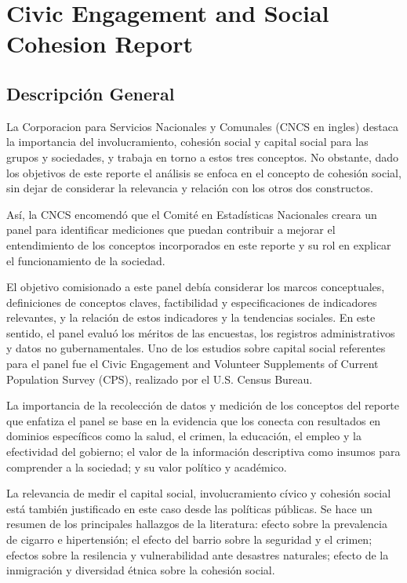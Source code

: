 \documentclass[
  12pt,
]{book}
\begin{document}
\hypertarget{civic-engagement-and-social-cohesion-report}{%
\chapter{Civic Engagement and Social Cohesion Report}\label{civic-engagement-and-social-cohesion-report}}

\hypertarget{descripciuxf3n-general-3}{%
\section{Descripción General}\label{descripciuxf3n-general-3}}

La Corporacion para Servicios Nacionales y Comunales (CNCS en ingles)
destaca la importancia del involucramiento, cohesión social y capital
social para las grupos y sociedades, y trabaja en torno a estos tres
conceptos. No obstante, dado los objetivos de este reporte el análisis
se enfoca en el concepto de cohesión social, sin dejar de considerar la
relevancia y relación con los otros dos constructos.

Así, la CNCS encomendó que el Comité en Estadísticas Nacionales creara
un panel para identificar mediciones que puedan contribuir a mejorar el
entendimiento de los conceptos incorporados en este reporte y su rol en
explicar el funcionamiento de la sociedad.

El objetivo comisionado a este panel debía considerar los marcos
conceptuales, definiciones de conceptos claves, factibilidad y
especificaciones de indicadores relevantes, y la relación de estos
indicadores y la tendencias sociales. En este sentido, el panel evaluó
los méritos de las encuestas, los registros administrativos y datos no
gubernamentales. Uno de los estudios sobre capital social referentes
para el panel fue el Civic Engagement and Volunteer Supplements of
Current Population Survey (CPS), realizado por el U.S. Census Bureau.

La importancia de la recolección de datos y medición de los conceptos
del reporte que enfatiza el panel se base en la evidencia que los
conecta con resultados en dominios específicos como la salud, el crimen,
la educación, el empleo y la efectividad del gobierno; el valor de la
información descriptiva como insumos para comprender a la sociedad; y su
valor político y académico.

La relevancia de medir el capital social, involucramiento cívico y
cohesión social está también justificado en este caso desde las
políticas públicas. Se hace un resumen de los principales hallazgos de
la literatura: efecto sobre la prevalencia de cigarro e hipertensión; el
efecto del barrio sobre la seguridad y el crimen; efectos sobre la
resilencia y vulnerabilidad ante desastres naturales; efecto de la
inmigración y diversidad étnica sobre la cohesión social.
\end{document}

